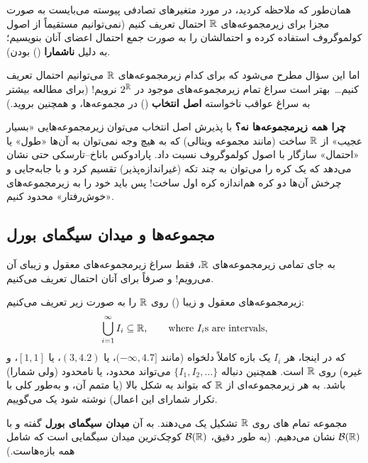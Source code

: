 همان‌طور که ملاحظه کردید، در مورد متغیرهای تصادفی پیوسته می‌بایست به صورت مجزا برای زیرمجموعه‌های $\R$ احتمال تعریف کنیم (نمی‌توانیم مستقیماً از اصول کولموگروف استفاده کرده و احتمالشان را به صورت جمع احتمال اعضای آنان بنویسیم؛ به دلیل \textbf{ناشمارا} () بودن).

اما این سؤال مطرح می‌شود که برای کدام زیرمجموعه‌های $\R$ می‌توانیم احتمال تعریف کنیم\ldots\ بهتر است سراغ تمام زیرمجموعه‌های موجود در $2^\R$ نرویم! (برای مطالعه بیشتر به سراغ عواقب ناخواسته \textbf{اصل انتخاب} () در مجموعه‌ها، و همچنین  بروید.)

\begin{note}
\notetitle \textbf{چرا همه زیرمجموعه‌ها نه؟} با پذیرش اصل انتخاب می‌توان زیرمجموعه‌هایی «بسیار عجیب» از $\R$ ساخت (مانند مجموعه ویتالی) که به هیچ وجه نمی‌توان به آن‌ها «طول» یا «احتمال» سازگار با اصول کولموگروف نسبت داد. پارادوکس باناخ--تارسکی حتی نشان می‌دهد که یک کره را می‌توان به چند تکه (غیراندازه‌پذیر) تقسیم کرد و با جابه‌جایی و چرخش آن‌ها دو کره هم‌اندازه کره اول ساخت! پس باید خود را به زیرمجموعه‌های «خوش‌رفتار» محدود کنیم.
\end{note}

\subsection{مجموعه‌ها و میدان سیگمای بورل }

به جای تمامی زیرمجموعه‌های $\R$، فقط سراغ زیرمجموعه‌های \textcolor{red!70!black}{معقول و زیبای} آن می‌رویم! و صرفاً برای آنان احتمال تعریف می‌کنیم.

\begin{definition}
زیرمجموعه‌های معقول و زیبا () روی $\R$ را به صورت زیر تعریف می‌کنیم:
\[
\bigcup_{i=1}^{\infty}I_i\subseteq\R,\qquad \text{where } I_i\text{s are intervals},
\]
که در اینجا، هر $I_i$ یک بازه کاملاً دلخواه (مانند $(-\infty,4.7]$، یا $(3,4.2)$، یا $[1,1]$، و غیره) روی $\R$ است. همچنین دنباله $\{I_1,I_2,\ldots\}$ می‌تواند محدود، یا نامحدود (ولی شمارا) باشد. به هر زیرمجموعه‌ای از $\R$ که بتواند به شکل بالا (یا متمم آن، و به‌طور کلی با تکرار شمارای این اعمال) نوشته شود یک  می‌گوییم.
\end{definition}

\begin{theorem}
مجموعه تمام های روی $\R$ تشکیل یک  می‌دهند. به آن \textbf{میدان سیگمای بورل} گفته و با $\mathcal{B}(\R)$ نشان می‌دهیم. (به طور دقیق، $\mathcal{B}(\R)$ کوچک‌ترین میدان سیگمایی است که شامل همه بازه‌هاست.)
\end{theorem}

